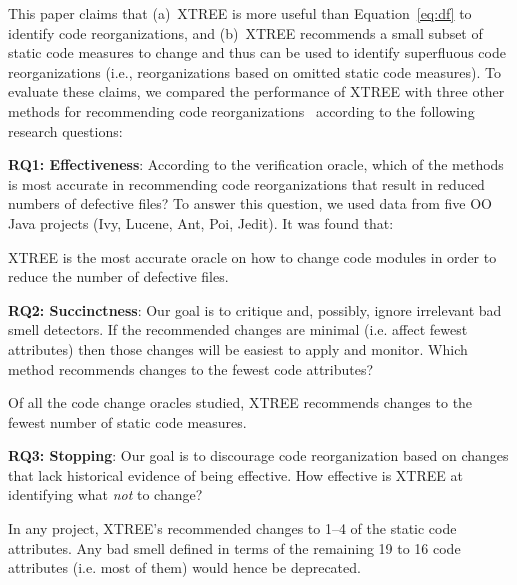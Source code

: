 \documentclass[twocolumn,5p]{elsarticle}
\newcommand{\eq}[1]{Equation~\ref{eq:#1}}
\theoremstyle{break}
\begin{document}
	This paper  claims that (a)~XTREE is more useful than \eq{df} to identify code reorganizations, and (b)~XTREE recommends a small subset of static code measures to change and thus can be used to identify superfluous code reorganizations (i.e., reorganizations based on omitted
	static code measures). To evaluate these claims, we compared the performance of XTREE with three other methods for recommending code reorganizations~\cite{Shatnawi10,Alves2010,me12c} according to the following research questions:
	
	
	{\bf  RQ1: Effectiveness}: According to the verification oracle, which of the methods is most accurate in recommending code reorganizations that result in reduced numbers of defective files? 
To answer this question, we used data from five OO Java projects
	(Ivy, Lucene, Ant, Poi, Jedit). It was found that:
	\begin{lesson}
		XTREE is the most accurate oracle on how to change code modules in order to reduce the number of defective files.
	\end{lesson}
	
	{\bf RQ2: Succinctness}: Our goal is to critique and, possibly,
	ignore irrelevant bad smell detectors.  If the recommended changes are minimal (i.e. affect fewest attributes) then those changes
	will be easiest to apply and monitor. Which method recommends changes to the fewest
	code attributes?
	\begin{lesson}
		Of all the code change oracles studied, XTREE recommends changes to the fewest number of static code measures.
	\end{lesson}
	
	{\bf RQ3: Stopping}: Our goal is to discourage code reorganization based on changes that lack
	historical evidence of being effective. How effective is XTREE at identifying what {\em not} to change?
	\begin{lesson}
		In  any  project,  XTREE's  recommended  changes  to 1--4 
		of the  static code attributes.  Any bad smell defined in terms of the remaining 19 to 16 code attributes (i.e. most of them)
		would hence be deprecated.
	\end{lesson}
	
\end{document}
